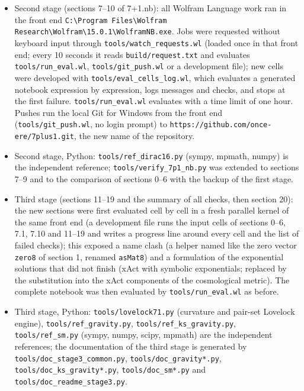 \documentclass[10pt,a4paper]{article}
\begin{document}
\begin{itemize}
\item Second stage (sections 7–10 of 7+1.nb): all Wolfram Language work ran in the front end \texttt{C:\textbackslash{}\allowbreak{}Program Files\textbackslash{}\allowbreak{}Wolfram Research\textbackslash{}\allowbreak{}Wolfram\textbackslash{}\allowbreak{}15.0.1\textbackslash{}\allowbreak{}WolframNB.exe}. Jobs were requested without keyboard input through \texttt{tools/\allowbreak{}watch\_\allowbreak{}requests.wl} (loaded once in that front end; every 10 seconds it reads \texttt{build/\allowbreak{}request.txt} and evaluates \texttt{tools/\allowbreak{}run\_\allowbreak{}eval.wl}, \texttt{tools/\allowbreak{}git\_\allowbreak{}push.wl} or a development file); new cells were developed with \texttt{tools/\allowbreak{}eval\_\allowbreak{}cells\_\allowbreak{}log.wl}, which evaluates a generated notebook expression by expression, logs messages and checks, and stops at the first failure. \texttt{tools/\allowbreak{}run\_\allowbreak{}eval.wl} evaluates with a time limit of one hour. Pushes run the local Git for Windows from the front end (\texttt{tools/\allowbreak{}git\_\allowbreak{}push.wl}, no login prompt) to \texttt{https:/\allowbreak{}/\allowbreak{}github.com/\allowbreak{}once-ere/\allowbreak{}7plus1.git}, the new name of the repository.
\item Second stage, Python: \texttt{tools/\allowbreak{}ref\_\allowbreak{}dirac16.py} (sympy, mpmath, numpy) is the independent reference; \texttt{tools/\allowbreak{}verify\_\allowbreak{}7p1\_\allowbreak{}nb.py} was extended to sections 7–9 and to the comparison of sections 0–6 with the backup of the first stage.
\item Third stage (sections 11–19 and the summary of all checks, then section 20): the new sections were first evaluated cell by cell in a fresh parallel kernel of the same front end (a development file runs the input cells of sections 0–6, 7.1, 7.10 and 11–19 and writes a progress line around every cell and the list of failed checks); this exposed a name clash (a helper named like the zero vector \texttt{zero8} of section 1, renamed \texttt{asMat8}) and a formulation of the exponential solutions that did not finish (xAct with symbolic exponentials; replaced by the substitution into the xAct components of the cosmological metric). The complete notebook was then evaluated by \texttt{tools/\allowbreak{}run\_\allowbreak{}eval.wl} as before.
\item Third stage, Python: \texttt{tools/\allowbreak{}lovelock71.py} (curvature and pair-set Lovelock engine), \texttt{tools/\allowbreak{}ref\_\allowbreak{}gravity.py}, \texttt{tools/\allowbreak{}ref\_\allowbreak{}ks\_\allowbreak{}gravity.py}, \texttt{tools/\allowbreak{}ref\_\allowbreak{}sm.py} (sympy, numpy, scipy, mpmath) are the independent references; the documentation of the third stage is generated by \texttt{tools/\allowbreak{}doc\_\allowbreak{}stage3\_\allowbreak{}common.py}, \texttt{tools/\allowbreak{}doc\_\allowbreak{}gravity*.py}, \texttt{tools/\allowbreak{}doc\_\allowbreak{}ks\_\allowbreak{}gravity*.py}, \texttt{tools/\allowbreak{}doc\_\allowbreak{}sm*.py} and \texttt{tools/\allowbreak{}doc\_\allowbreak{}readme\_\allowbreak{}stage3.py}.

\end{itemize}
\end{document}
